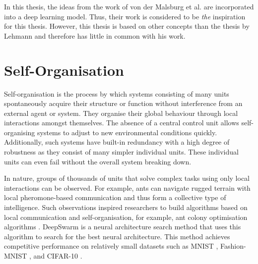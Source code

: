In this thesis, the ideas from the work of von der Malsburg et al. \cite{von_der_Malsburg_Stadelmann_Grewe_2022} are incorporated into a deep learning model.
Thus, their work is considered to be \emph{the} inspiration for this thesis.
However, this thesis is based on other concepts than the thesis by Lehmann \cite{lehmann} and therefore has little in common with his work.



\section{Self-Organisation}
Self-organisation is the process by which systems consisting of many units spontaneously acquire their structure or function without interference from an external agent or system.
They organise their global behaviour through local interactions amongst themselves.
The absence of a central control unit allows self-organising systems to adjust to new environmental conditions quickly.
Additionally, such systems have built-in redundancy with a high degree of robustness as they consist of many simpler individual units.
These individual units can even fail without the overall system breaking down.

In nature, groups of thousands of units that solve complex tasks using only local interactions can be observed.
For example, ants can navigate rugged terrain with local pheromone-based communication and thus form a collective type of intelligence.
Such observations inspired researchers to build algorithms based on local communication and self-organisation, for example, ant colony optimisation algorithms .
DeepSwarm  is a neural architecture search method that uses this algorithm to search for the best neural architecture.
This method achieves competitive performance on relatively small datasets such as MNIST \cite{Lecun_Bottou_Bengio_Haffner_1998}, Fashion-MNIST \cite{xiao2017/online}, and CIFAR-10 \cite{cifar_10}.

